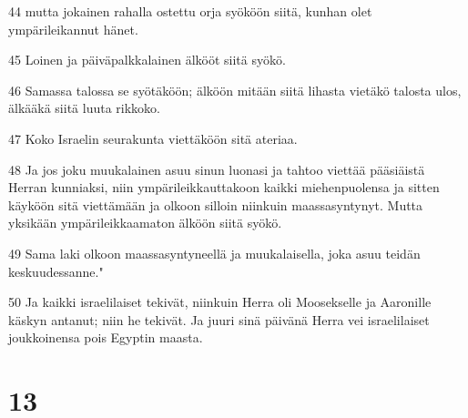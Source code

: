 \par 44 mutta jokainen rahalla ostettu orja syököön siitä, kunhan olet ympärileikannut hänet.
\par 45 Loinen ja päiväpalkkalainen älkööt siitä syökö.
\par 46 Samassa talossa se syötäköön; älköön mitään siitä lihasta vietäkö talosta ulos, älkääkä siitä luuta rikkoko.
\par 47 Koko Israelin seurakunta viettäköön sitä ateriaa.
\par 48 Ja jos joku muukalainen asuu sinun luonasi ja tahtoo viettää pääsiäistä Herran kunniaksi, niin ympärileikkauttakoon kaikki miehenpuolensa ja sitten käyköön sitä viettämään ja olkoon silloin niinkuin maassasyntynyt. Mutta yksikään ympärileikkaamaton älköön siitä syökö.
\par 49 Sama laki olkoon maassasyntyneellä ja muukalaisella, joka asuu teidän keskuudessanne."
\par 50 Ja kaikki israelilaiset tekivät, niinkuin Herra oli Moosekselle ja Aaronille käskyn antanut; niin he tekivät. Ja juuri sinä päivänä Herra vei israelilaiset joukkoinensa pois Egyptin maasta.

\chapter{13}

